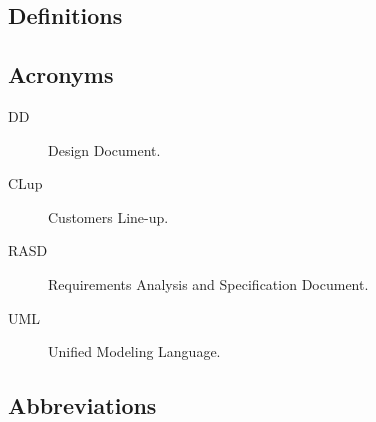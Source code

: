 \documentclass[../../main.tex]{subfiles}
\begin{document}
\subsection{Definitions}


\subsection{Acronyms}

\begin{description}

    \item[DD] Design Document.
    
    \item[CLup] Customers Line-up.
    
    \item[RASD] Requirements Analysis and Specification Document.
    
    \item[UML] Unified Modeling Language.

\end{description}

\subsection{Abbreviations}
\end{document}
